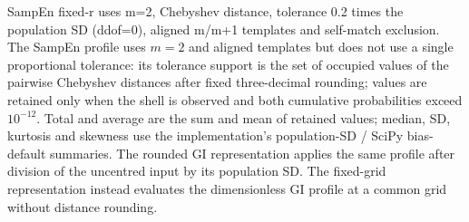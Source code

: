 \documentclass[10pt]{article}
\begin{document}
\par\smallskip\noindent\footnotesize SampEn fixed-r uses m=2, Chebyshev distance, tolerance 0.2 times the population SD (ddof=0), aligned m/m+1 templates and self-match exclusion. The SampEn profile uses $m=2$ and aligned templates but does not use a single proportional tolerance: its tolerance support is the set of occupied values of the pairwise Chebyshev distances after fixed three-decimal rounding; values are retained only when the shell is observed and both cumulative probabilities exceed $10^{-12}$. Total and average are the sum and mean of retained values; median, SD, kurtosis and skewness use the implementation's population-SD / SciPy bias-default summaries. The rounded GI representation applies the same profile after division of the uncentred input by its population SD. The fixed-grid representation instead evaluates the dimensionless GI profile at a common grid without distance rounding.
\end{document}
